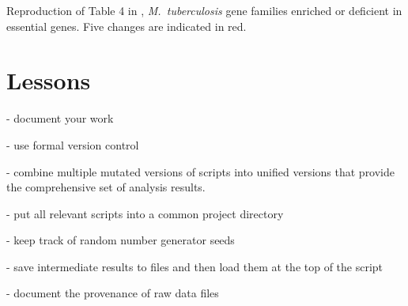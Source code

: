 \begin{table}
\caption{Reproduction of Table 4 in \citet{lamichhane2003},
\emph{M.\ tuberculosis\/} gene families enriched or deficient in
essential genes. Five changes are indicated in red.\label{tab:tab4}}

\centering
\small

\end{table}





\section{Lessons}

- document your work

- use formal version control

- combine multiple mutated versions of scripts into unified versions
  that provide the comprehensive set of analysis results.

- put all relevant scripts into a common project directory

- keep track of random number generator seeds

- save intermediate results to files and then load them at the top of
  the script

- document the provenance of raw data files
